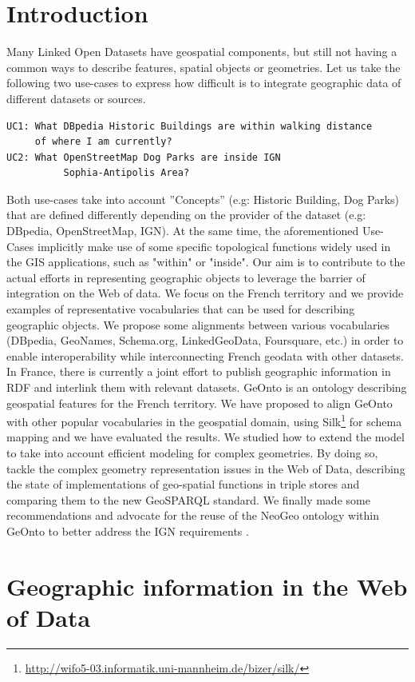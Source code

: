 \documentclass[a4paper,11pt]{report}
\begin{document}
\section{Introduction}
 Many Linked Open Datasets have geospatial components, but still not having a common ways to describe features, spatial objects or geometries. Let us take the following two use-cases to express how difficult is to integrate geographic data of different datasets or sources. 
\begin{verbatim}
UC1: What DBpedia Historic Buildings are within walking distance 
     of where I am currently?
UC2: What OpenStreetMap Dog Parks are inside IGN
          Sophia-Antipolis Area?
\end{verbatim} 
 Both use-cases take into account ''Concepts'' (e.g: Historic Building, Dog Parks) that are defined differently depending on the provider of the dataset (e.g: DBpedia, OpenStreetMap, IGN). At the same time, the aforementioned Use-Cases implicitly make use of some specific topological functions widely used in the GIS applications, such as "within" or "inside". Our aim is to contribute to the actual efforts in representing geographic objects to leverage the barrier of integration on the Web of data. We focus on the French territory and we provide examples of representative vocabularies that can be used for describing geographic objects. We propose some alignments between various vocabularies (DBpedia, GeoNames, Schema.org, LinkedGeoData, Foursquare, etc.) in order to enable interoperability while interconnecting French geodata with other datasets. In France, there is  currently a joint effort to publish geographic information in RDF  and interlink them with relevant datasets. GeOnto is an ontology describing geospatial features for the French territory. We have proposed to align GeOnto with other popular vocabularies in the geospatial domain, using Silk\footnote{\url{http://wifo5-03.informatik.uni-mannheim.de/bizer/silk/}} for schema mapping and we have evaluated the results. We studied how to extend the model to take into account efficient modeling for complex geometries. By doing so, tackle the complex geometry representation issues in the Web of Data, describing the state of implementations of geo-spatial functions in triple stores and comparing them to the new GeoSPARQL standard.  We finally made some recommendations and advocate for the reuse of the NeoGeo ontology within GeOnto to better address the IGN requirements \cite{atemezing2012b}.


\section{Geographic information in the Web of Data}                         \label{sec:geo-in-web-of-data}
\end{document}
